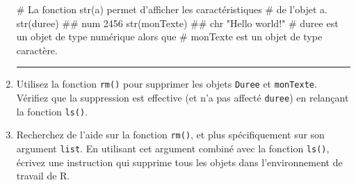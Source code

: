 \documentclass[12pt,twosided, notitlepage]{book}
\newenvironment{Shaded}{}{}
\newcommand{\CommentTok}[1]{\textcolor[rgb]{0.00,0.50,0.00}{#1}}
\newcommand{\KeywordTok}[1]{\textcolor[rgb]{0.00,0.00,1.00}{#1}}
\newcommand{\NormalTok}[1]{#1}
\newif \ifsol
\renewenvironment{Shaded}{\begin{snugshade}}{\end{snugshade}}
\begin{document}
\begin{enumerate}
\begin{Shaded}
\begin{Highlighting}[]
\CommentTok{# La fonction str(a) permet d'afficher les caractéristiques}
\CommentTok{# de l'objet a.}
\KeywordTok{str}\NormalTok{(duree)}
\NormalTok{  ##  num 2456}
\KeywordTok{str}\NormalTok{(monTexte)}
\NormalTok{  ##  chr "Hello world!"}
\CommentTok{# duree est un objet de type numérique alors que}
\CommentTok{# monTexte est un objet de type caractère.}
\end{Highlighting}
\end{Shaded}

  \begin{center} \rule{0.5\linewidth}{\linethickness}\end{center} 
    \bigskip 
    \fi
\item
  Utilisez la fonction \texttt{rm()} pour supprimer
  les objets \texttt{Duree} et \texttt{monTexte}. Vérifiez que la
  suppression est effective (et n'a pas affecté \texttt{duree}) en
  relançant la fonction \texttt{ls()}.

  \ifsol 

  \begin{center} \rule{0.5\linewidth}{\linethickness}\end{center}

\begin{Shaded}
\begin{Highlighting}[]
\CommentTok{# Objets présents au début de la question}
\KeywordTok{ls}\NormalTok{()}
\NormalTok{  ## [1] "duree"    "Duree"    "min"      "monTexte" "sec"}

\CommentTok{# La fonction rm() (de l'anglais remove) permet de supprimer }
\CommentTok{# un ou plusieurs objets.}
\KeywordTok{rm}\NormalTok{(Duree, monTexte)}
\KeywordTok{ls}\NormalTok{()}
\NormalTok{  ## [1] "duree" "min"   "sec"}
\CommentTok{# Les objets Duree et monTexte ont bien été supprimés.}
\end{Highlighting}
\end{Shaded}

  \begin{center} \rule{0.5\linewidth}{\linethickness}\end{center} 
    \bigskip 
    \fi
\item
  Recherchez de l'aide sur la fonction \texttt{rm()},
  et plus spécifiquement sur son argument \texttt{list}. En utilisant
  cet argument combiné avec la fonction
  \texttt{ls()}, écrivez une instruction qui supprime
  tous les objets dans l'environnement de travail de R.


\end{enumerate}
\end{document}
